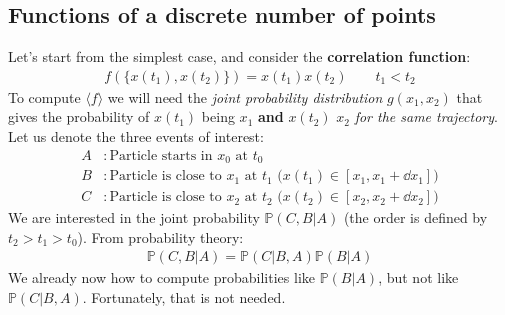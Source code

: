 \documentclass[../template.tex]{subfiles}
\begin{document}
\subsection{Functions of a discrete number of points}
Let's start from the simplest case, and consider the \textbf{correlation function}:
\begin{align*}
    f(\{x(t_1), x(t_2)\}) = x(t_1) x(t_2) \qquad t_1 < t_2
\end{align*}
To compute $\langle f \rangle$ we will need the \textit{joint probability distribution} $g(x_1,x_2)$ that gives the probability of $x(t_1)$ being  $x_1$ \textbf{and} $x(t_2)$  $x_2$ \textit{for the same trajectory}. Let us denote the three events of interest:
\begin{align*}
    A &\colon \text{Particle starts in $x_0$ at $t_0$}\\
    B &\colon \text{Particle is close to $x_1$ at $t_1$ ($x(t_1) \in [x_1, x_1+\dd{x_1}]$)}\\
    C &\colon \text{Particle is close to $x_2$ at $t_2$ ($x(t_2) \in [x_2, x_2+\dd{x_2}]$)} 
\end{align*}
We are interested in the joint probability $\mathbb{P}(C,B|A)$ (the order is defined by $t_2 > t_1 > t_0$). From probability theory:
\begin{align*}
    \mathbb{P}(C,B|A) = \mathbb{P}(C|B,A) \mathbb{P}(B|A)
\end{align*} 
We already now how to compute probabilities like $\mathbb{P}(B|A)$, but not like $\mathbb{P}(C|B,A)$. Fortunately, that is not needed.
\end{document}
